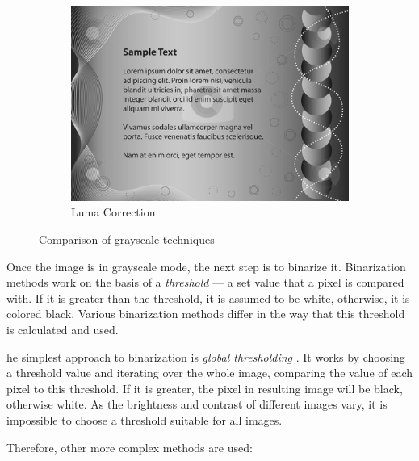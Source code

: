 \begin{figure}[H]
\begin{subfigure}{0.31\textwidth}
\includegraphics[width=\linewidth]{img/grayscale_luma.png}
\caption{Luma Correction}\label{fig:1c}
\end{subfigure}
\caption{Comparison of grayscale techniques} \label{fig:1}
\end{figure}

Once the image is in grayscale mode, the next step is to binarize it. Binarization methods work on the basis of a \emph{threshold} --- a set value that a pixel is compared with. If it is greater than the threshold, it is assumed to be white, otherwise, it is colored black. Various binarization methods differ in the way that this threshold is calculated and used.

he simplest approach to binarization is \emph{global thresholding} \citep{globalThresh}. It works by choosing a threshold value and iterating over the whole image, comparing the value of each pixel to this threshold. If it is greater, the pixel in resulting image will be black, otherwise white. As the brightness and contrast of different images vary, it is impossible to choose a threshold suitable for all images.

Therefore, other more complex methods are used:

